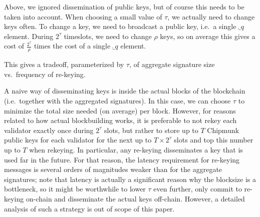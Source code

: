 \bigskip
Above, we ignored dissemination of public keys, but of course this needs to be taken into account.
When choosing a small value of $\tau$, we actually need to change keys often.
To change a key, we need to broadcast a public key, i.e.\ a single $\ring_q$ element.
During $2^\tau$ timeslots, we need to change $\rho$ keys, so on average this gives a cost of $\frac{2^\tau}{\rho}$ times the cost of a single $\ring_q$ element.

This gives a tradeoff, parameterized by $\tau$, of aggregate signature size vs.\ frequency of re-keying.

A naive way of disseminating keys is inside the actual blocks of the blockchain (i.e.\ together with the aggregated signatures).
In this case, we can choose $\tau$ to minimize the total size needed (on average) per block.
However, for reasons related to how actual blockbuilding works, it is preferable to not rekey each validator exactly once during $2^\tau$ slots, but rather to store up to $T$ Chipmunk public keys for each validator for the next up to $T\times 2^\tau$ slots and top this number up to $T$ when rekeying.
In particular, any re-keying disseminates a key that is used far in the future.
For that reason, the latency requirement for re-keying messages is several orders of magnitudes weaker than for the aggregate signatures;
note that latency is actually a significant reason why the blocksize is a bottleneck, so it might be worthwhile to lower $\tau$ even further, only commit to re-keying on-chain and disseminate the actual keys off-chain.
However, a detailed analysis of such a strategy is out of scope of this paper.
